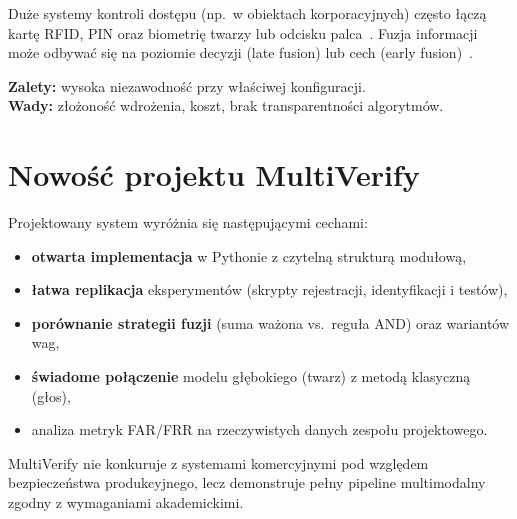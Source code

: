 Duże systemy kontroli dostępu (np.\ w obiektach korporacyjnych) często łączą kartę RFID, PIN oraz biometrię twarzy lub odcisku palca~\cite{jain2008introduction}. Fuzja informacji może odbywać się na poziomie decyzji (late fusion) lub cech (early fusion)~\cite{ross2006multimodal}.

\textbf{Zalety:} wysoka niezawodność przy właściwej konfiguracji.\\
\textbf{Wady:} złożoność wdrożenia, koszt, brak transparentności algorytmów.

\section{Nowość projektu MultiVerify}

Projektowany system wyróżnia się następującymi cechami:
\begin{itemize}
    \item \textbf{otwarta implementacja} w Pythonie z czytelną strukturą modułową,
    \item \textbf{łatwa replikacja} eksperymentów (skrypty rejestracji, identyfikacji i testów),
    \item \textbf{porównanie strategii fuzji} (suma ważona vs.\ reguła AND) oraz wariantów wag,
    \item \textbf{świadome połączenie} modelu głębokiego (twarz) z metodą klasyczną (głos),
    \item analiza metryk FAR/FRR na rzeczywistych danych zespołu projektowego.
\end{itemize}

MultiVerify nie konkuruje z systemami komercyjnymi pod względem bezpieczeństwa produkcyjnego, lecz demonstruje pełny pipeline multimodalny zgodny z wymaganiami akademickimi.
